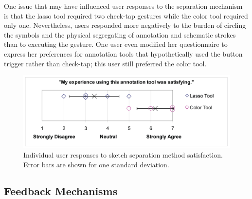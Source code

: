 \documentclass{egpubl}
\begin{document}
One issue that may have influenced user responses to the separation
mechanism is that the lasso tool required two check-tap gestures while
the color tool required only one.  Nevertheless, users responded more
negatively to the burden of circling the symbols and the physical
segregating of annotation and schematic strokes than to executing the
gesture.  One user even modified her questionnaire to express her
preferences for annotation tools that hypothetically used the button
trigger rather than check-tap; this user still preferred the color
tool.


\begin{figure}[tb]
  \centering
  \includegraphics[width=1.0\linewidth]{annotationSatisfying.png}
  \caption{\label{fig:annotationSatisfaction} Individual user
           responses to sketch separation method satisfaction.  Error bars are shown for
           one standard deviation.}
           
\end{figure}



\subsection{Feedback Mechanisms}
\end{document}

